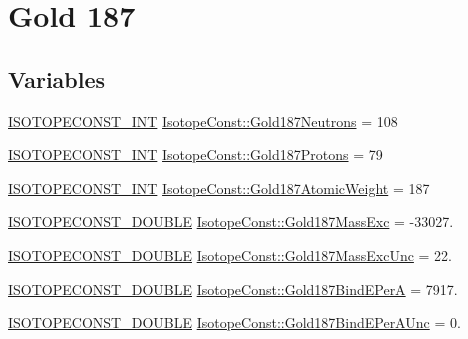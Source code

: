 \hypertarget{group___isotope_const-_gold-_au187}{}\section{Gold 187}
\label{group___isotope_const-_gold-_au187}
\subsection*{Variables}
\begin{DoxyCompactItemize}
\item 
\mbox{\hyperlink{group___isotope_const-_macros_ga5f18360b3e99483a35c32d789e62621c}{I\+S\+O\+T\+O\+P\+E\+C\+O\+N\+S\+T\+\_\+\+I\+NT}} \mbox{\hyperlink{group___isotope_const-_gold-_au187_ga70992341677ea6a53479831d30239f6b}{Isotope\+Const\+::\+Gold187\+Neutrons}} = 108
\item 
\mbox{\hyperlink{group___isotope_const-_macros_ga5f18360b3e99483a35c32d789e62621c}{I\+S\+O\+T\+O\+P\+E\+C\+O\+N\+S\+T\+\_\+\+I\+NT}} \mbox{\hyperlink{group___isotope_const-_gold-_au187_gaeadc227dddd40564d1fadc910a652317}{Isotope\+Const\+::\+Gold187\+Protons}} = 79
\item 
\mbox{\hyperlink{group___isotope_const-_macros_ga5f18360b3e99483a35c32d789e62621c}{I\+S\+O\+T\+O\+P\+E\+C\+O\+N\+S\+T\+\_\+\+I\+NT}} \mbox{\hyperlink{group___isotope_const-_gold-_au187_gae6f726b3981b802d216d5f5ca25e284e}{Isotope\+Const\+::\+Gold187\+Atomic\+Weight}} = 187
\item 
\mbox{\hyperlink{group___isotope_const-_macros_ga8f45a7272ce02c0b4c65c44636ed719a}{I\+S\+O\+T\+O\+P\+E\+C\+O\+N\+S\+T\+\_\+\+D\+O\+U\+B\+LE}} \mbox{\hyperlink{group___isotope_const-_gold-_au187_gacc262740c050964c8ec31378ff7cf144}{Isotope\+Const\+::\+Gold187\+Mass\+Exc}} = -\/33027.
\item 
\mbox{\hyperlink{group___isotope_const-_macros_ga8f45a7272ce02c0b4c65c44636ed719a}{I\+S\+O\+T\+O\+P\+E\+C\+O\+N\+S\+T\+\_\+\+D\+O\+U\+B\+LE}} \mbox{\hyperlink{group___isotope_const-_gold-_au187_ga0173e30cd3e6322ec81e8e7ab992a79a}{Isotope\+Const\+::\+Gold187\+Mass\+Exc\+Unc}} = 22.
\item 
\mbox{\hyperlink{group___isotope_const-_macros_ga8f45a7272ce02c0b4c65c44636ed719a}{I\+S\+O\+T\+O\+P\+E\+C\+O\+N\+S\+T\+\_\+\+D\+O\+U\+B\+LE}} \mbox{\hyperlink{group___isotope_const-_gold-_au187_gadc53e8a7b13353ca153545c86230bc63}{Isotope\+Const\+::\+Gold187\+Bind\+E\+PerA}} = 7917.
\item 
\mbox{\hyperlink{group___isotope_const-_macros_ga8f45a7272ce02c0b4c65c44636ed719a}{I\+S\+O\+T\+O\+P\+E\+C\+O\+N\+S\+T\+\_\+\+D\+O\+U\+B\+LE}} \mbox{\hyperlink{group___isotope_const-_gold-_au187_ga72cce29858554a8ce0702059bc1211d1}{Isotope\+Const\+::\+Gold187\+Bind\+E\+Per\+A\+Unc}} = 0.

\end{DoxyCompactItemize}
